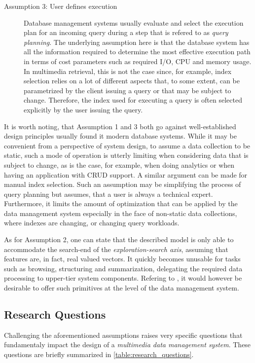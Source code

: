 \begin{description}
    \item[Assumption 3: User defines execution] Database management systems usually evaluate and select the execution plan for an incoming query during a step that is refered to as \emph{query planning}. The underlying assumption here is that the database system has all the information required to determine the most effective execution path in terms of cost parameters such as required I/O, CPU and memory usage. In multimedia retrieval, this is not the case since, for example, index selection relies on a lot of different aspects that, to some extent, can be parametrized by the client issuing a query or that may be subject to change. Therefore, the index used for executing a query is often selected explicitly by the user issuing the query.
\end{description}

It is worth noting, that Assumption 1 and 3 both go against well-established design principles usually found it modern database systems.  While it may be convenient from a perspective of system design, to assume a data collection to be static, such a mode of operation is utterly limiting when considering data that is subject to change, as is the case, for example, when doing analytics or when having an application with CRUD support. A similar argument can be made for manual index selection. Such an assumption may be simplifying the process of query planning but assumes, that a user is always a technical expert. Furthermore, it limits the amount of optimization that can be applied by the data management system especially in the face of non-static data collections, where indexes are changing, or changing query workloads. 

As for Assumption 2, one can state that the described model is only able to accommodate the search-end of the \emph{exploration-search axis}, assuming that features are, in fact, real valued vectors. It quickly becomes unusable for tasks such as browsing, structuring and summarization, delegating the required data processing to upper-tier system components. Refering to \cite{Jonson:2016}, it would however be desirable to offer such primitives at the level of the data management system.

\subsection{Research Questions}

Challenging the aforementioned assumptions raises very specific questions that fundamentaly impact the design of a \emph{multimedia data management system}. These questions are briefly summarized in \cref{table:research_questions}.

